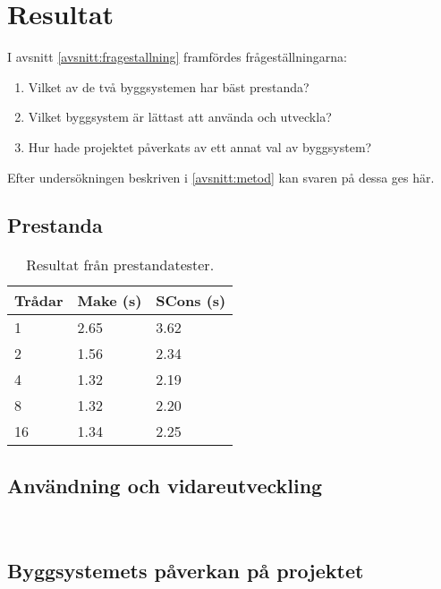 \section{Resultat}
I avsnitt \ref{avsnitt:fragestallning} framfördes frågeställningarna:

\begin{enumerate}
\item Vilket av de två byggsystemen har bäst prestanda?
\item Vilket byggsystem är lättast att använda och utveckla?
\item Hur hade projektet påverkats av ett annat val av byggsystem?
\end{enumerate}

\noindent Efter undersökningen beskriven i \ref{avsnitt:metod} kan svaren på dessa ges här.

\subsection{Prestanda}
\begin{table}[h!]
  \centering
  \begin{tabular}{|l|l|l|}
    \hline
    \textbf{Trådar} & \textbf{Make} (s) & \textbf{SCons} (s) \\ \hline
    1 & 2.65 & 3.62 \\ \hline
    2 & 1.56 & 2.34 \\ \hline
    4 & 1.32 & 2.19 \\ \hline
    8 & 1.32 & 2.20 \\ \hline
    16 & 1.34 & 2.25 \\ \hline
  \end{tabular}
  \caption{Resultat från prestandatester.}
  \label{tabell:prestanda}
\end{table}


\subsection{Användning och vidareutveckling}
 \\

\subsection{Byggsystemets påverkan på projektet}

